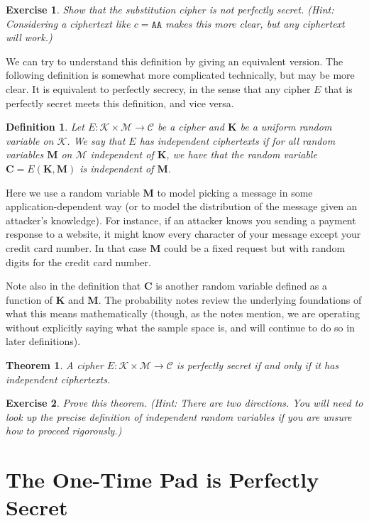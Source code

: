\documentclass[11pt]{article}
\newtheorem{exercise}{Exercise}
\newtheorem{theorem}{Theorem}
\newtheorem{definition}{Definition}
\newcommand{\msgs}{\mathcal{M}}
\newcommand{\ctxts}{\mathcal{C}}
\newcommand{\keys}{\mathcal{K}}
\newcommand{\enc}{E}
\newcommand{\bK}{\mathbf{K}}
\newcommand{\bM}{\mathbf{M}}
\newcommand{\bC}{\mathbf{C}}
\begin{document}
\begin{exercise}
    Show that the substitution cipher is not perfectly secret.  (Hint:
    Considering a ciphertext like $c=\mathtt{AA}$ makes this more clear, but
    any ciphertext will work.)
\end{exercise}

We can try to understand this definition by giving an equivalent version.
The following definition is somewhat more complicated technically, but may
be more clear. It is equivalent to perfectly secrecy, in the sense that
any cipher $E$ that is perfectly secret meets this definition, and vice versa.
\begin{definition} 
    Let $\enc : \keys\times\msgs \to \ctxts$ be a cipher and $\bK$ be a uniform
    random variable on $\keys$.  We say that $\enc$ has \emph{independent
    ciphertexts} if for all random variables $\bM$ on $\msgs$ independent of
    $\bK$, we have that the random variable $\bC = \enc(\bK,\bM)$ is
    independent of $\bM$.
\end{definition}
Here we use a random variable $\bM$ to model picking a message
in some application-dependent way (or to model the distribution of the message
given an attacker's knowledge). For instance, if an attacker knows you
sending a payment response to a website, it might know every character of your
message except your credit card number. In that case $\bM$ could be a fixed
request but with random digits for the credit card number.

Note also in the definition that $\bC$ is another random variable defined as a
function of $\bK$ and $\bM$. The probability notes review the underlying
foundations of what this means mathematically (though, as the notes mention, we
are operating without explicitly saying what the sample space is, and will
continue to do so in later definitions).


\begin{theorem}
    A cipher $\enc : \keys\times\msgs \to \ctxts$ is perfectly secret
    if and only if it has independent ciphertexts.
\end{theorem}

\begin{exercise}
    Prove this theorem. (Hint: There are two directions. You will need
    to look up the precise definition of independent random variables
    if you are unsure how to proceed rigorously.)
\end{exercise}

\section{The One-Time Pad is Perfectly Secret}
\end{document}

